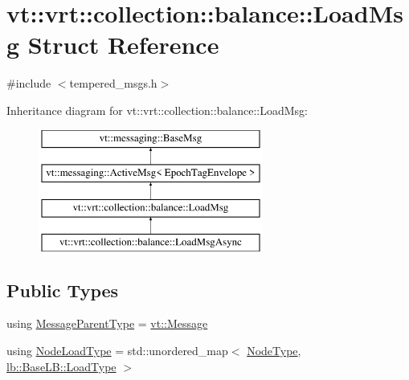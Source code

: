 \hypertarget{structvt_1_1vrt_1_1collection_1_1balance_1_1_load_msg}{}\section{vt\+:\+:vrt\+:\+:collection\+:\+:balance\+:\+:Load\+Msg Struct Reference}
\label{structvt_1_1vrt_1_1collection_1_1balance_1_1_load_msg}


{\ttfamily \#include $<$tempered\+\_\+msgs.\+h$>$}

Inheritance diagram for vt\+:\+:vrt\+:\+:collection\+:\+:balance\+:\+:Load\+Msg\+:\begin{figure}[H]
\begin{center}
\leavevmode
\includegraphics[height=4.000000cm]{structvt_1_1vrt_1_1collection_1_1balance_1_1_load_msg}
\end{center}
\end{figure}
\subsection*{Public Types}
\begin{DoxyCompactItemize}
\item 
using \hyperlink{structvt_1_1vrt_1_1collection_1_1balance_1_1_load_msg_a922095d2c2ceb7f192523defa012ca6d}{Message\+Parent\+Type} = \hyperlink{namespacevt_a3a3ddfef40b4c90915fa43cdd5f129ea}{vt\+::\+Message}
\item 
using \hyperlink{structvt_1_1vrt_1_1collection_1_1balance_1_1_load_msg_a65e300c2d6119d11e9121b17f7f94850}{Node\+Load\+Type} = std\+::unordered\+\_\+map$<$ \hyperlink{namespacevt_a866da9d0efc19c0a1ce79e9e492f47e2}{Node\+Type}, \hyperlink{structvt_1_1vrt_1_1collection_1_1lb_1_1_base_l_b_a215e22b9f12678303f49615ae3be05cc}{lb\+::\+Base\+L\+B\+::\+Load\+Type} $>$
\end{DoxyCompactItemize}
